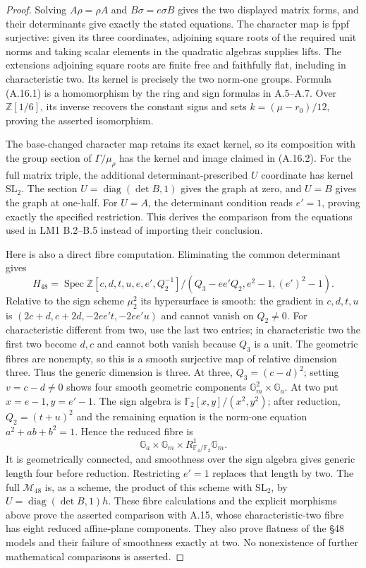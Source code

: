 \begin{proof}
Solving $A\rho=\rho A$ and $B\sigma=e\sigma B$ gives the two
displayed matrix forms, and their determinants give exactly the
stated equations. The character map is fppf surjective: given its
three coordinates, adjoining square roots of the required unit norms
and taking scalar elements in the quadratic algebras supplies lifts.
The extensions adjoining square roots are finite free and faithfully
flat, including in characteristic two. Its kernel is precisely the
two norm-one groups. Formula (A.16.1) is a homomorphism by the ring
and sign formulas in A.5--A.7. Over $\mathbb Z[1/6]$, its inverse
recovers the constant signs and sets $k=(\mu-r_0)/12$, proving the
asserted isomorphism.

The base-changed character map retains its exact kernel, so its
composition with the group section of $\Gamma/\mu_\rho$ has the
kernel and image claimed in (A.16.2). For the full matrix triple,
the additional determinant-prescribed $U$ coordinate has kernel
$\mathrm{SL}_2$. The section $U=\operatorname{diag}(\det B,1)$
gives the graph at zero, and $U=B$ gives the graph at one-half.
For $U=A$, the determinant condition reads $e'=1$, proving exactly
the specified restriction. This derives the comparison from the
equations used in LM1 B.2--B.5 instead of importing their conclusion.

Here is also a direct fibre computation. Eliminating the common
determinant gives
\[
 H_{48}=\operatorname{Spec}
 \mathbb Z[c,d,t,u,e,e',Q_2^{-1}]/
 (Q_3-ee'Q_2,e^2-1,(e')^2-1).
\]
Relative to the sign scheme $\mu_2^2$ its hypersurface is smooth:
the gradient in $c,d,t,u$ is
$(2c+d,c+2d,-2ee't,-2ee'u)$ and cannot vanish on $Q_2\ne0$.
For characteristic different from two, use the last two entries;
in characteristic two the first two become $d,c$ and cannot both
vanish because $Q_3$ is a unit. The geometric fibres are nonempty,
so this is a smooth surjective map of relative dimension three.
Thus the generic dimension is three. At three,
$Q_3=(c-d)^2$; setting $v=c-d\ne0$ shows four smooth geometric
components $\mathbb G_m^2\times\mathbb G_a$.
At two put $x=e-1,y=e'-1$. The sign algebra is
$\mathbb F_2[x,y]/(x^2,y^2)$; after reduction, $Q_2=(t+u)^2$ and
the remaining equation is the norm-one equation
$a^2+ab+b^2=1$. Hence the reduced fibre is
\[
 \mathbb G_a\times\mathbb G_m\times
 R^1_{\mathbb F_4/\mathbb F_2}\mathbb G_m.
\]
It is geometrically connected, and smoothness over the sign algebra
gives generic length four before reduction. Restricting $e'=1$
replaces that length by two. The full $\mathcal M_{48}$ is, as a
scheme, the product of this scheme with $\mathrm{SL}_2$, by
$U=\operatorname{diag}(\det B,1)h$.
These fibre calculations and the explicit morphisms above prove
the asserted comparison with A.15, whose characteristic-two fibre
has eight reduced affine-plane components. They also prove flatness
of the \S48 models and their failure of smoothness exactly at two.
No nonexistence of further mathematical comparisons is asserted.
\end{proof}

